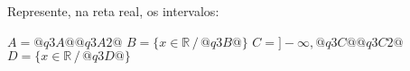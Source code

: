 \documentclass[a4paper,11pt,addpoints]{exam}
\begin{document}
\begin{questions}
\question[1]

Represente, na reta real, os intervalos:

\begin{tasks}
  \task $A = \big@q3A@\big@q3A2@$
  \task $B = \big\{x \in \mathbb{R} \,/\, @q3B@\big\}$
  \task $C = \big]-\infty, @q3C@\big@q3C2@$
  \task $D = \big\{x \in \mathbb{R} \,/\, @q3D@\big\}$
\end{tasks}

\begin{solution}[1in]


\end{solution}
\end{questions}
\end{document}
